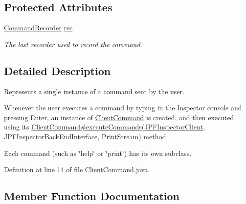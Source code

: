\subsection*{Protected Attributes}
\begin{DoxyCompactItemize}
\item 
\hyperlink{classgov_1_1nasa_1_1jpf_1_1inspector_1_1client_1_1_command_recorder}{Command\+Recorder} \hyperlink{classgov_1_1nasa_1_1jpf_1_1inspector_1_1client_1_1_client_command_af4246f2427035c72a6af45a2c61361f7}{rec}
\begin{DoxyCompactList}\small\item\em The last recorder used to record the command. \end{DoxyCompactList}\end{DoxyCompactItemize}


\subsection{Detailed Description}
Represents a single instance of a command sent by the user. 

Whenever the user executes a command by typing in the Inspector console and pressing Enter, an instance of \hyperlink{classgov_1_1nasa_1_1jpf_1_1inspector_1_1client_1_1_client_command}{Client\+Command} is created, and then executed using its \hyperlink{interfacegov_1_1nasa_1_1jpf_1_1inspector_1_1client_1_1_client_command_interface_a6cf0905afd7822cee3268e286a7dcdd0}{Client\+Command\#execute\+Commands(\+J\+P\+F\+Inspector\+Client, J\+P\+F\+Inspector\+Back\+End\+Interface, Print\+Stream)} method.

Each command (such as \char`\"{}help\char`\"{} or \char`\"{}print\char`\"{}) has its own subclass. 

Definition at line 14 of file Client\+Command.\+java.



\subsection{Member Function Documentation}
